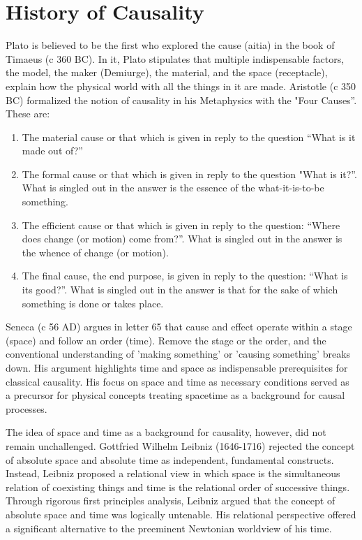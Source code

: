 \documentclass{article}
\begin{document}
\section{History of Causality}
\label{sec:history}

Plato is believed to be the first who explored the cause (aitia) in the book of Timaeus (c 360 BC). In it, Plato stipulates that multiple indispensable factors, the model, the maker (Demiurge), the material, and the space (receptacle), explain how the physical world with all the things in it are made\cite{PlatoTimaeusSEP}. Aristotle (c 350 BC) formalized the notion of causality in his Metaphysics\cite{AristotleMetaphysicsSEP} with the  "Four Causes”\cite{AristotleCausalitySEP}. These are:

\begin{enumerate}
    \item The material cause or that which is given in reply to the question “What is it made out of?”
    \item The formal cause or that which is given in reply to the question "What is it?”. What is singled out in the answer is the essence of the what-it-is-to-be something.
    \item The efficient cause or that which is given in reply to the question: “Where does change (or motion) come from?”. What is singled out in the answer is the whence of change (or motion).
    \item The final cause, the end purpose, is given in reply to the question: “What is its good?”. What is singled out in the answer is that for the sake of which something is done or takes place.
\end{enumerate}

Seneca (c 56 AD) argues in letter 65\cite{SenecaLetters} that cause and effect operate within a stage (space) and follow an order (time). Remove the stage or the order, and the conventional understanding of 'making something' or 'causing something' breaks down. His argument highlights time and space as indispensable prerequisites for classical causality. His focus on space and time as necessary conditions served as a precursor for physical concepts treating spacetime as a background for causal processes.

The idea of space and time as a background for causality, however, did not remain unchallenged. Gottfried Wilhelm Leibniz (1646-1716) rejected the concept of absolute space and absolute time as independent, fundamental constructs. Instead, Leibniz proposed\cite{LeibnizPhysicsSEP} a relational view in which space is the simultaneous relation of coexisting things and time is the relational order of successive things.
Through rigorous first principles analysis, Leibniz argued that the concept of absolute space and time was logically untenable.
His relational perspective offered a significant alternative to the preeminent Newtonian worldview of his time.
\end{document}
